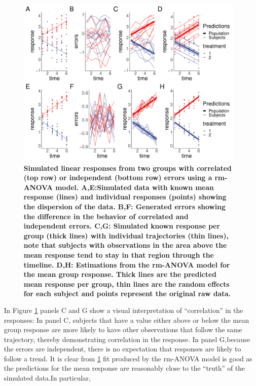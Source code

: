 \documentclass[
]{article}
\begin{document}
\begin{figure}
\centering
\includegraphics{Manuscript_AM_v2_files/figure-latex/linear-models-1.pdf}
\caption{\label{fig:linear-models}\textbf{Simulated linear responses from two groups with correlated (top row) or independent (bottom row) errors using a rm-ANOVA model. A,E:Simulated data with known mean response (lines) and individual responses (points) showing the dispersion of the data. B,F: Generated errors showing the difference in the behavior of correlated and independent errors. C,G: Simulated known response per group (thick lines) with individual trajectories (thin lines), note that subjects with observations in the area above the mean response tend to stay in that region through the timeline. D,H: Estimations from the rm-ANOVA model for the mean group response. Thick lines are the predicted mean response per group, thin lines are the random effects for each subject and points represent the original raw data.}}
\end{figure}

In Figure \ref{fig:linear-models} panels C and G show a visual interpretation of ``correlation'' in the responses: In panel C, subjects that have a value either above or below the mean group response are more likely to have other observations that follow the same trajectory, thereby demonstrating correlation in the response. In panel G,because the errors are independent, there is no expectation that responses are likely to follow a trend. It is clear from \ref{fig:linear-models} fit produced by the rm-ANOVA model is good as the predictions for the mean response are reasonably close to the ``truth'' of the simulated data.In particular,
\end{document}
